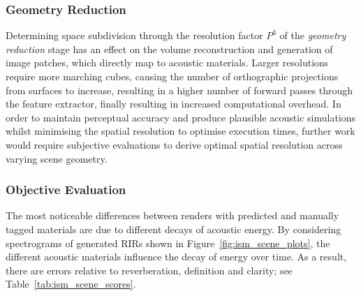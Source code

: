 \subsubsection{Geometry Reduction}
Determining space subdivision through the resolution factor $P^3$ of the \emph{geometry reduction} stage has an effect on the volume reconstruction and generation of image patches, which directly map to acoustic materials. Larger resolutions require more marching cubes, causing the number of orthographic projections from surfaces to increase, resulting in a higher number of forward passes through the feature extractor, finally resulting in increased computational overhead. In order to maintain perceptual accuracy and produce plausible acoustic simulations whilst minimising the spatial resolution to optimise execution times, further work would require subjective evaluations to derive optimal spatial resolution across varying scene geometry. \par

\subsubsection{Objective Evaluation}
The most noticeable differences between renders with predicted and manually tagged materials are due to different decays of acoustic energy. By considering spectrograms of generated RIRs shown in Figure~\ref{fig:ism_scene_plots}, the different acoustic materials influence the decay of energy over time. As a result, there are errors relative to reverberation, definition and clarity; see Table~\ref{tab:ism_scene_scores}. \par

